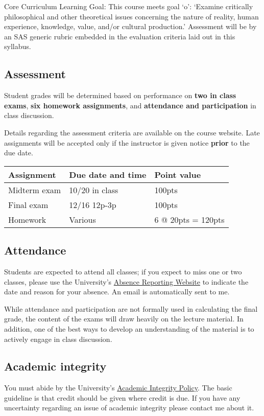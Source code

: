 \documentclass{article}
\begin{document}
Core Curriculum Learning Goal: This course meets goal `o': `Examine critically philosophical and other theoretical issues concerning the nature of reality, human experience, knowledge, value, and/or cultural production.' Assessment will be by an SAS generic rubric embedded in the evaluation criteria laid out in this syllabus.

\subsection*{Assessment}
Student grades will be determined based on performance on \textbf{two in class exams}, \textbf{six homework assignments}, and \textbf{attendance and participation} in class discussion.  

Details regarding the assessment criteria are available on the course website.  Late assignments will be accepted only if the instructor is given notice \textbf{prior} to the due date.

\vspace{3mm}
\begin{tabular}{lll}
 Assignment & Due date and time & Point value \\ \hline
 Midterm exam & 10/20 in class & 100pts \\
 Final exam & 12/16 12p-3p & 100pts \\
 Homework & Various & 6 @ 20pts = 120pts \\
\end{tabular}

\subsection*{Attendance}
Students are expected to attend all classes; if you expect to miss one or two classes, please use the University's \href{https://sims.rutgers.edu/ssra/}{Absence Reporting Website} to indicate the date and reason for your absence. An email is automatically sent to me.  

While attendance and participation are not formally used in calculating the final grade, the content of the exams will draw heavily on the lecture material.  In addition, one of the best ways to develop an understanding of the material is to actively engage in class discussion. 

\subsection*{Academic integrity}
You must abide by the University's \href{http://academicintegrity.rutgers.edu/integrity.shtml}{Academic Integrity Policy}.  The basic guideline is that credit should be given where credit is due.  If you have any uncertainty regarding an issue of academic integrity please contact me about it.
\end{document}

